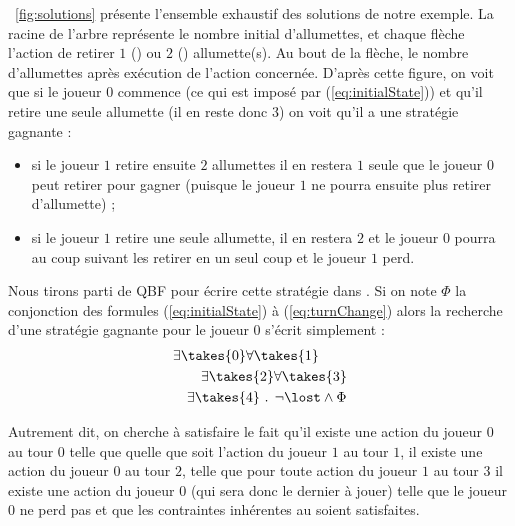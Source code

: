 

\figurename~\ref{fig:solutions} présente l'ensemble exhaustif des solutions de notre exemple. La racine de l'arbre représente le nombre initial d'allumettes, et chaque flèche l'action de retirer $1$ () ou $2$ () allumette(s). Au bout de la flèche, le nombre d'allumettes après exécution de l'action concernée. D'après cette figure, on voit que si le joueur $0$ commence (ce qui est imposé par (\ref{eq:initialState})) et qu'il retire une seule allumette (il en reste donc 3) on voit qu'il a une stratégie gagnante : 
\begin{itemize}
\item si le joueur $1$ retire ensuite $2$ allumettes il en restera $1$ seule que le joueur $0$ peut retirer pour gagner (puisque le joueur $1$ ne pourra ensuite plus retirer d'allumette) ;

\item si le joueur $1$ retire une seule allumette, il en restera  $2$ et le joueur $0$ pourra au coup suivant les retirer en un seul coup et le joueur $1$ perd.
\end{itemize}

Nous tirons parti de QBF pour écrire cette stratégie dans \touist. Si on note $\Phi$ la conjonction des formules (\ref{eq:initialState}) à (\ref{eq:turnChange}) alors la recherche d'une stratégie gagnante pour le joueur $0$ s'écrit simplement :
\vspace{-0.2cm}
\begin{align}
\begin{split}
&\exists \takes{0}
\forall \takes{1}\\
&\qquad\exists \takes{2}
\forall \takes{3} \\
&\quad\exists \takes{4}\text{ . }\neg \lost \land \Phi
\end{split}
\end{align}

\noindent
Autrement dit, on cherche à satisfaire le fait qu'il existe une action du joueur $0$ au tour $0$ telle que quelle que soit l'action du joueur $1$ au tour $1$, il existe une action du joueur $0$ au tour $2$, telle que pour toute action du joueur $1$ au tour $3$ il existe une action du joueur $0$ (qui sera donc le dernier à jouer) telle que le joueur $0$ ne perd pas et que les contraintes inhérentes au \game soient satisfaites.

